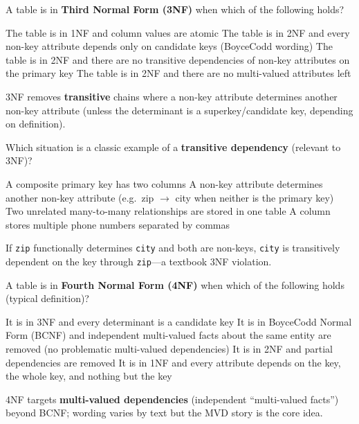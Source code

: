 \question[4]
A table is in \textbf{Third Normal Form (3NF)} when which of the following holds?
\begin{choices}
  \choice The table is in 1NF and column values are atomic
  \choice The table is in 2NF and every non-key attribute depends only on candidate keys (Boyce\textendash Codd wording)
  \CorrectChoice The table is in 2NF and there are no transitive dependencies of non-key attributes on the primary key
  \choice The table is in 2NF and there are no multi-valued attributes left
\end{choices}
\begin{solution}
  3NF removes \textbf{transitive} chains where a non-key attribute determines another non-key attribute (unless the determinant is a superkey/candidate key, depending on definition).
\end{solution}

\question[4]
Which situation is a classic example of a \textbf{transitive dependency} (relevant to 3NF)?
\begin{choices}
  \choice A composite primary key has two columns
  \CorrectChoice A non-key attribute determines another non-key attribute (e.g.\ zip $\rightarrow$ city when neither is the primary key)
  \choice Two unrelated many-to-many relationships are stored in one table
  \choice A column stores multiple phone numbers separated by commas
\end{choices}
\begin{solution}
  If \texttt{zip} functionally determines \texttt{city} and both are non-keys, \texttt{city} is transitively dependent on the key through \texttt{zip}---a textbook 3NF violation.
\end{solution}

\question[4]
A table is in \textbf{Fourth Normal Form (4NF)} when which of the following holds (typical definition)?
\begin{choices}
  \choice It is in 3NF and every determinant is a candidate key
  \CorrectChoice It is in Boyce\textendash Codd Normal Form (BCNF) and independent multi-valued facts about the same entity are removed (no problematic multi-valued dependencies)
  \choice It is in 2NF and partial dependencies are removed
  \choice It is in 1NF and every attribute depends on the key, the whole key, and nothing but the key
\end{choices}
\begin{solution}
  4NF targets \textbf{multi-valued dependencies} (independent ``multi-valued facts'') beyond BCNF; wording varies by text but the MVD story is the core idea.
\end{solution}

